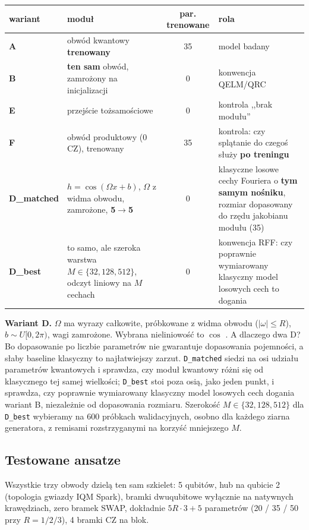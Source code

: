 \documentclass[11pt, a4paper]{article}
\begin{document}
\begin{table}[H]
\centering
\renewcommand{\arraystretch}{1.3}
\begin{tabularx}{\textwidth}{l X c X}
\toprule
\textbf{wariant} & \textbf{moduł} & \textbf{par. trenowane} & \textbf{rola} \\
\midrule
\textbf{A} & obwód kwantowy \textbf{trenowany} & 35 & model badany \\
\textbf{B} & \textbf{ten sam} obwód, zamrożony na inicjalizacji & 0 & konwencja QELM/QRC \\
\textbf{E} & przejście tożsamościowe & 0 & kontrola ,,brak modułu'' \\
\textbf{F} & obwód produktowy (0 CZ), trenowany & 35 & kontrola: czy splątanie do czegoś służy \textbf{po treningu} \\
\textbf{D\_matched} & $h = \cos(\Omega x + b)$, $\Omega$ z widma obwodu, zamrożone, \textbf{5$\rightarrow$5} & 0 & klasyczne losowe cechy Fouriera o \textbf{tym samym nośniku}, rozmiar dopasowany do rzędu jakobianu modułu (35) \\
\textbf{D\_best} & to samo, ale szeroka warstwa $M \in \{32, 128, 512\}$, odczyt liniowy na $M$ cechach & 0 & konwencja RFF: czy poprawnie wymiarowany klasyczny model losowych cech to dogania \\
\bottomrule
\end{tabularx}
\end{table}
\textbf{Wariant D.} $\Omega$ ma wyrazy całkowite, próbkowane z widma obwodu ($|\omega| \le R$), $b \sim U[0,2\pi)$, wagi zamrożone. Wybrana nieliniowość to $\cos$ \citet{sakurai2026}. A dlaczego dwa D? Bo dopasowanie po liczbie parametrów nie gwarantuje dopasowania pojemności, a słaby baseline klasyczny to najłatwiejszy zarzut.  \texttt{D\_matched} siedzi na osi udziału parametrów kwantowych i sprawdza, czy moduł kwantowy różni się od klasycznego tej samej wielkości; \texttt{D\_best} stoi poza osią, jako jeden punkt, i sprawdza, czy poprawnie wymiarowany klasyczny model losowych cech dogania wariant B, niezależnie od dopasowania rozmiaru. Szerokość $M \in \{32, 128, 512\}$ dla \texttt{D\_best} wybieramy na 600 próbkach walidacyjnych, osobno dla każdego ziarna generatora, z remisami rozstrzyganymi na korzyść mniejszego $M$.

\subsection{Testowane ansatze}

Wszystkie trzy obwody dzielą ten sam szkielet: 5 qubitów, hub na qubicie 2 (topologia gwiazdy IQM Spark), bramki dwuqubitowe wyłącznie na natywnych krawędziach, zero bramek SWAP, dokładnie $5R\cdot3 + 5$ parametrów (20 / 35 / 50 przy $R = 1/2/3$), 4 bramki CZ na blok.
\end{document}
